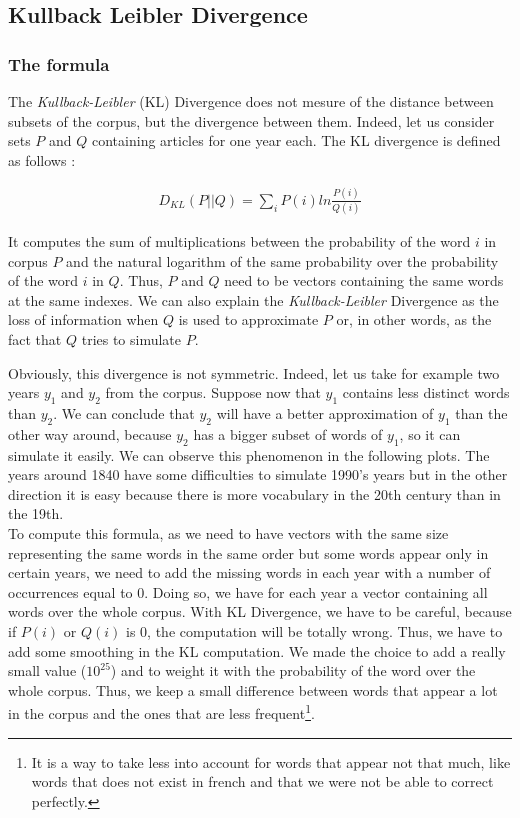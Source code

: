 \subsection{Kullback Leibler Divergence}

\subsubsection{The formula}
The \emph{Kullback-Leibler} (KL) Divergence does not mesure of the distance between subsets of the corpus, but the divergence between them. Indeed, let us consider sets $P$ and $Q$ containing articles for one year each. The KL divergence is defined as follows :

\begin{eqnarray}\label{KL}
    D_{KL}(P||Q) = \sum_i P(i) ln \frac{P(i)}{Q(i)}
\end{eqnarray}

It computes the sum of multiplications between the probability of the word $i$ in corpus $P$ and the natural logarithm of the same probability over the probability of the word $i$ in $Q$. Thus, $P$ and $Q$ need to be vectors containing the same words at the same indexes. We can also explain the \emph{Kullback-Leibler} Divergence as the loss of information
when $Q$ is used to approximate $P$ or, in other words, as the fact that $Q$ tries to simulate $P$.

Obviously, this divergence is not symmetric. Indeed, let us take for example two years $y_1$ and $y_2$ from the corpus. Suppose now that $y_1$ contains less distinct words than $y_2$. We can conclude that $y_2$ will have a better approximation of $y_1$ than the other way around, because $y_2$ has a bigger subset of words of $y_1$, so it can simulate it easily. We can observe this phenomenon in the following plots. The years around 1840 have some difficulties to simulate 1990's years but in the other direction it is easy because there is more vocabulary in the 20th century than in the 19th.\\

To compute this formula, as we need to have vectors with the same size representing the same words in the same order but some words appear only in certain years, we need to add the missing words in each year with a number of occurrences equal to 0. Doing so, we have for each year a vector containing all words over the whole corpus. With KL Divergence, we have to be careful, because if $P(i)$ or $Q(i)$ is 0, the computation will be totally wrong. Thus, we have to add some smoothing in the KL computation. We made the choice to add a really small value ($10^{25}$) and to weight it with the probability of the word over the whole corpus. Thus, we keep a small difference between words that appear a lot in the corpus and the ones that are less frequent\footnote{It is a way to take less into account for words that appear not that much, like words that does not exist in french and that we were not be able to correct perfectly.}.

